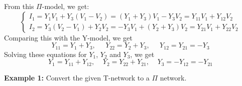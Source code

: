 \begin{itemize}
\begin{itemize}
    From this $\Pi$-model, we get:
    \[ \left\{ \begin{array}{l} 
      I_1=Y_1V_1+Y_3(V_1-V_2)=(Y_1+Y_3)V_1-Y_3V_2=Y_{11}V_1+Y_{12}V_2 \\
      I_2=Y_3(V_2-V_1)+Y_2V_2=-Y_3V_1+(Y_2+Y_3)V_2=Y_{21}V_1+Y_{22}V_2 \end{array} \right. \]
    Comparing this with the Y-model, we get
    \[ Y_{11}=Y_1+Y_3,\;\;\;\;\;Y_{22}=Y_2+Y_3,\;\;\;\;\;Y_{12}=Y_{21}=-Y_3	\]
    Solving these equations for $Y_1$, $Y_2$ and $Y_3$, we get
    \[ Y_1=Y_{11}+Y_{12},\;\;\;\;Y_2=Y_{22}+Y_{21},\;\;\;\;Y_3=-Y_{12}=-Y_{21} \]
\end{itemize}

{\bf Example 1:} Convert the given T-network to a $\Pi$ network.



\end{itemize}
